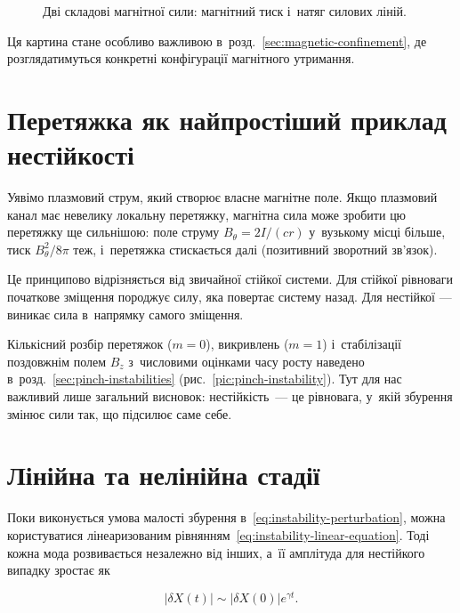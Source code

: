 \begin{figure}[ht]
\centering
{}
\caption{Дві складові магнітної сили: магнітний тиск і~натяг силових
ліній.}
\label{fig:magnetic-pressure-tension}
\end{figure}

Ця картина стане особливо важливою в~розд.~\ref{sec:magnetic-confinement}, де
розглядатимуться конкретні конфігурації магнітного утримання.

\section{Перетяжка як найпростіший приклад нестійкості}

Уявімо плазмовий струм, який створює власне магнітне поле. Якщо
плазмовий канал має невелику локальну перетяжку, магнітна сила може
зробити цю перетяжку ще сильнішою: поле струму $B_\theta=2I/(cr)$ у~вузькому місці більше,
тиск $B_\theta^2/8\pi$ теж, і~перетяжка стискається далі (позитивний зворотний зв'язок).

Це принципово відрізняється від звичайної стійкої системи. Для
стійкої рівноваги початкове зміщення породжує силу, яка повертає
систему назад. Для нестійкої --- виникає сила в~напрямку самого
зміщення.

Кількісний розбір перетяжок ($m=0$), викривлень ($m=1$) і~стабілізації поздовжнім полем $B_z$
з~числовими оцінками часу росту наведено в~розд.~\ref{sec:pinch-instabilities}
(рис.~\ref{pic:pinch-instability}). Тут для нас важливий лише загальний висновок: нестійкість~---
це рівновага, у~якій збурення змінює сили так, що підсилює саме себе.

\section{Лінійна та нелінійна стадії}

Поки виконується умова малості збурення в~\eqref{eq:instability-perturbation},
можна користуватися лінеаризованим рівнянням~\eqref{eq:instability-linear-equation}.
Тоді кожна мода розвивається незалежно від інших, а~її амплітуда
для нестійкого випадку зростає як

\begin{equation}
|\delta X(t)|
\sim
|\delta X(0)|e^{\gamma t}.
\label{eq:instability-linear-growth}
\end{equation}


